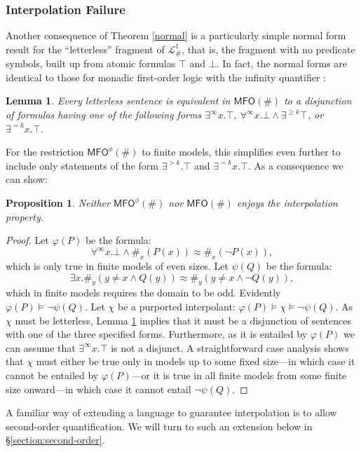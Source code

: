 \documentclass[12pt,oneside,reqno]{amsart}
\newtheorem{proposition}{Proposition}
\newtheorem{lemma}{Lemma}
\theoremstyle{definition}
\begin{document}
\subsubsection{Interpolation Failure} Another consequence of   Theorem \ref{normal} is a particularly simple normal form  result for the ``letterless'' fragment of $\mathcal{L}_\#^1$, that is, the fragment with no predicate symbols, built up from atomic formulas $\top$ and $\bot$. In fact, the  normal forms are identical to those for monadic first-order logic with the infinity quantifier \citep{Carreiro}:
\begin{lemma} Every letterless sentence is equivalent in $\mathsf{MFO}(\#)$ to a disjunction of formulas having one of the following forms $\exists^\infty x. \top$, 
$\forall^\infty x. \bot \wedge \exists^{\geq k} \top$, or  $\exists^{=k} x. \top$. \label{letterless-normalform}
\end{lemma} For the restriction $\mathsf{MFO}^\phi(\#)$ to finite models, this simplifies even further to include only statements of the form $\exists^{>k}.\top$ and $\exists^{=k} x. \top$. As a consequence we can show: 
\begin{proposition} Neither $\mathsf{MFO}^\phi(\#)$ nor $\mathsf{MFO}(\#)$ enjoys the interpolation property. \label{prop:interpolation}
\end{proposition}
\begin{proof} Let $\varphi(P)$ be the formula: $$\forall^\infty x. \bot \wedge \#_x(P(x)) \approx \#_x(\neg P(x)),$$ which is only true in finite models of even sizes. Let $\psi(Q)$ be the formula: $$\exists x.\#_y( y \neq x \wedge Q(y) ) \approx \#_y( y \neq x \wedge \neg Q(y) ),$$ which in finite models requires the domain to be odd. Evidently $\varphi(P) \vDash \neg \psi(Q)$. Let $\chi$ be a purported interpolant: $\varphi(P) \vDash \chi \vDash \neg \psi(Q)$. As $\chi$ must be letterless, Lemma \ref{letterless-normalform} implies that it must be a disjunction of sentences with one of the three specified forms. Furthermore, as it is entailed by $\varphi(P)$ we can assume that $\exists^\infty x. \top$ is not a disjunct. A straightforward case analysis shows that $\chi$ must either be true only in models up to some fixed size---in which case it cannot be entailed by $\varphi(P)$---or it is true in all finite models from some finite size onward---in which case it cannot entail $\neg \psi(Q)$. 
\end{proof}

A familiar way of extending a language to guarantee interpolation is to allow second-order quantification. We will  turn to such an extension below in \S\ref{section:second-order}. 
\end{document}
